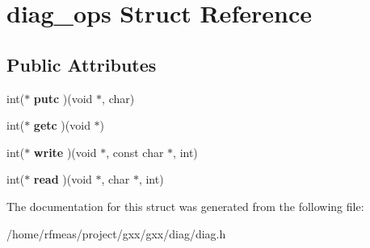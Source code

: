 \hypertarget{structdiag__ops}{}\section{diag\+\_\+ops Struct Reference}
\label{structdiag__ops}
\subsection*{Public Attributes}
\begin{DoxyCompactItemize}
\item 
int($\ast$ {\bfseries putc} )(void $\ast$, char)\hypertarget{structdiag__ops_a7d2d9c74bfc6c7993185ed57bfd6904e}{}\label{structdiag__ops_a7d2d9c74bfc6c7993185ed57bfd6904e}

\item 
int($\ast$ {\bfseries getc} )(void $\ast$)\hypertarget{structdiag__ops_a300331d1c1fb543e26cf6cfa53a26a66}{}\label{structdiag__ops_a300331d1c1fb543e26cf6cfa53a26a66}

\item 
int($\ast$ {\bfseries write} )(void $\ast$, const char $\ast$, int)\hypertarget{structdiag__ops_a45c3b44ce406c21aa0c88250735635da}{}\label{structdiag__ops_a45c3b44ce406c21aa0c88250735635da}

\item 
int($\ast$ {\bfseries read} )(void $\ast$, char $\ast$, int)\hypertarget{structdiag__ops_acc346736df0c59676a8c8646d6111dc4}{}\label{structdiag__ops_acc346736df0c59676a8c8646d6111dc4}

\end{DoxyCompactItemize}


The documentation for this struct was generated from the following file\+:\begin{DoxyCompactItemize}
\item 
/home/rfmeas/project/gxx/gxx/diag/diag.\+h\end{DoxyCompactItemize}
